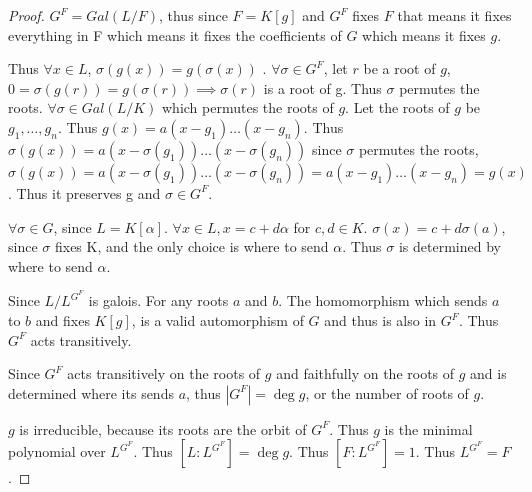 \documentclass{article}
\begin{document}
\begin{proof}
    $G^F = Gal(L / F)$, thus since $F = K[g]$ and $G^F$ fixes $F$ that means it fixes everything in F which means it fixes the coefficients of $G$ which means it fixes $g$.       
    
    Thus $\forall x \in L$, $\sigma(g(x)) = g(\sigma(x))$  . $\forall \sigma \in G^F$, let $r$ be a root of $g$, $0= \sigma(g(r)) = g(\sigma(r))\implies \sigma(r)$ is a root of g. Thus $\sigma$ permutes the roots. $\forall \sigma \in Gal(L / K)$ which permutes the roots of $g$. Let the roots of $g$ be $g_1, \dots, g_n$. Thus $g(x) = a(x - g_1)\dots(x - g_n)$. Thus $\sigma(g(x)) = a(x - \sigma(g_1))\dots(x - \sigma(g_n))$ since $\sigma$ permutes the roots, $\sigma(g(x)) = a(x - \sigma(g_1))\dots(x - \sigma(g_n)) = a(x - g_1)\dots(x - g_n) = g(x)$. Thus it preserves g and $\sigma \in G^F$. 
    
    $\forall \sigma \in G$, since $L = K[\alpha]$. $\forall x \in L, x = c + d \alpha$ for $c, d \in K$. $\sigma(x) = c + d \sigma(a)$, since $\sigma$ fixes K, and the only choice is where to send $\alpha$. Thus $\sigma$ is determined by where to send $\alpha$. 

    Since $L / L^{G^F}$ is galois. For any roots $a$ and $b$. The homomorphism which sends $a$ to $b$ and fixes $K[g]$, is a valid automorphism of $G$ and thus is also in $G^F$. Thus $G^F$ acts transitively.         

    Since $G^F$ acts transitively on the roots of $g$ and faithfully on the roots of $g$ and is determined where its sends $a$, thus $|G^F|  = \deg g$, or the number of roots of $g$.       

    $g$ is irreducible, because its roots are the orbit of $G^F$. Thus $g$ is the minimal polynomial over $L^{G^F}$. Thus $[L : L^{G^F}] = \deg g$. Thus $[F: L^{G^F}] = 1$. Thus $L^{G^F} = F$.                
\end{proof}

\bigskip
\end{document}
